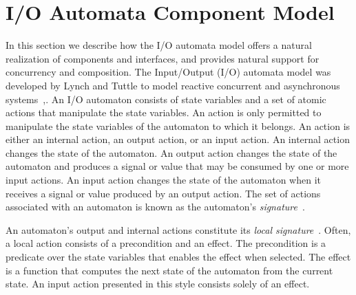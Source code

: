 \section{I/O Automata Component Model\label{component_model}}


In this section we describe how the I/O automata model offers a natural realization of components and interfaces, and provides natural support for concurrency and composition.
The Input/Output (I/O) automata model was developed by Lynch and Tuttle to model reactive concurrent and asynchronous systems~\cite{lynch1987hierarchical},\cite{lynch1996distributed}.
An I/O automaton consists of state variables and a set of atomic actions that manipulate the state variables.
An action is only permitted to manipulate the state variables of the automaton to which it belongs.
An action is either an internal action, an output action, or an input action.
An internal action changes the state of the automaton.
An output action changes the state of the automaton and produces a signal or value that may be consumed by one or more input actions.
An input action changes the state of the automaton when it receives a signal or value produced by an output action.
The set of actions associated with an automaton is known as the automaton's \emph{signature}~\cite{lynch1996distributed}.

An automaton's output and internal actions constitute its \emph{local signature}~\cite{lynch1996distributed}.
Often, a local action consists of a precondition and an effect.
The precondition is a predicate over the state variables that enables the effect when selected.
The effect is a function that computes the next state of the automaton from the current state.
An input action presented in this style consists solely of an effect.

